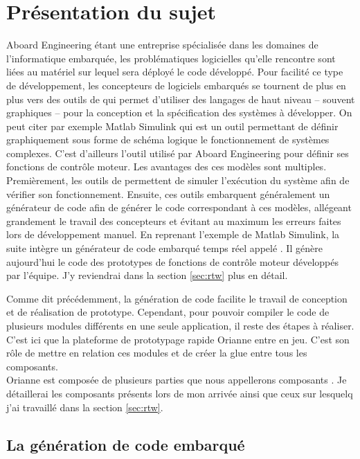 \chapter{Présentation du sujet}
Aboard Engineering étant une entreprise spécialisée dans les domaines de
l'informatique embarquée, les problématiques logicielles qu'elle rencontre sont
liées au matériel sur lequel sera déployé le code développé. Pour facilité ce
type de développement, les concepteurs de logiciels embarqués se tournent de
plus en plus vers des outils de  qui permet d'utiliser des langages
de haut niveau -- souvent graphiques -- pour la conception et la spécification
des systèmes à développer. On peut citer par exemple Matlab\up{\circledR}
Simulink\up{\circledR} qui est un outil permettant de définir graphiquement sous
forme de schéma logique le fonctionnement de systèmes complexes. C'est
d'ailleurs l'outil utilisé par Aboard Engineering pour définir ses fonctions de
contrôle moteur. Les avantages des ces modèles sont multiples. Premièrement, les
outils de  permettent de simuler l'exécution du système afin de
vérifier son fonctionnement. Ensuite, ces outils embarquent généralement un
générateur de code afin de générer le code correspondant à ces modèles,
allégeant grandement le travail des concepteurs et évitant au maximum les
erreurs faites lors de développement \og manuel\fg{}. En reprenant l'exemple de
Matlab\up{\circledR} Simulink\up{\circledR}, la suite intègre un générateur de
code embarqué temps réel appelé . Il génère aujourd'hui le code des
prototypes de fonctions de contrôle moteur développés par l'équipe. J'y
reviendrai dans la section \ref{sec:rtw} plus en détail.

Comme dit précédemment, la génération de code facilite le travail de conception
et de réalisation de prototype. Cependant, pour pouvoir compiler le code de
plusieurs modules différents en une seule application, il reste des étapes à
réaliser. C'est ici que la plateforme de prototypage rapide Orianne
entre en jeu. C'est son rôle de mettre en relation ces modules et de créer la
\og glue \fg{} entre tous les composants.\\
Orianne est composée de plusieurs parties que nous appellerons \og
composants \fg{}. Je détaillerai les composants présents lors de mon arrivée
ainsi que ceux sur lesquelq j'ai travaillé dans la section \ref{sec:rtw}.

\section{La génération de code embarqué}
